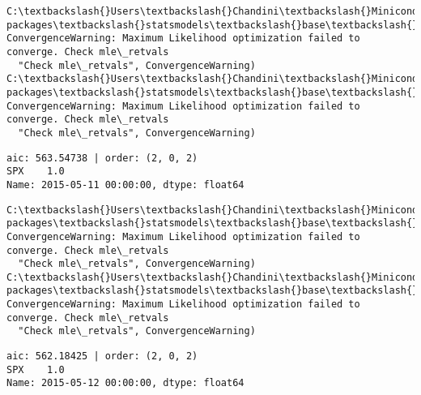 \documentclass[11pt]{article}
\begin{document}
    \begin{Verbatim}[commandchars=\\\{\}]
C:\textbackslash{}Users\textbackslash{}Chandini\textbackslash{}Miniconda3\textbackslash{}envs\textbackslash{}auquan\textbackslash{}lib\textbackslash{}site-packages\textbackslash{}statsmodels\textbackslash{}base\textbackslash{}model.py:496: ConvergenceWarning: Maximum Likelihood optimization failed to converge. Check mle\_retvals
  "Check mle\_retvals", ConvergenceWarning)
C:\textbackslash{}Users\textbackslash{}Chandini\textbackslash{}Miniconda3\textbackslash{}envs\textbackslash{}auquan\textbackslash{}lib\textbackslash{}site-packages\textbackslash{}statsmodels\textbackslash{}base\textbackslash{}model.py:496: ConvergenceWarning: Maximum Likelihood optimization failed to converge. Check mle\_retvals
  "Check mle\_retvals", ConvergenceWarning)

    \end{Verbatim}

    \begin{Verbatim}[commandchars=\\\{\}]
aic: 563.54738 | order: (2, 0, 2)
SPX    1.0
Name: 2015-05-11 00:00:00, dtype: float64

    \end{Verbatim}

    \begin{Verbatim}[commandchars=\\\{\}]
C:\textbackslash{}Users\textbackslash{}Chandini\textbackslash{}Miniconda3\textbackslash{}envs\textbackslash{}auquan\textbackslash{}lib\textbackslash{}site-packages\textbackslash{}statsmodels\textbackslash{}base\textbackslash{}model.py:496: ConvergenceWarning: Maximum Likelihood optimization failed to converge. Check mle\_retvals
  "Check mle\_retvals", ConvergenceWarning)
C:\textbackslash{}Users\textbackslash{}Chandini\textbackslash{}Miniconda3\textbackslash{}envs\textbackslash{}auquan\textbackslash{}lib\textbackslash{}site-packages\textbackslash{}statsmodels\textbackslash{}base\textbackslash{}model.py:496: ConvergenceWarning: Maximum Likelihood optimization failed to converge. Check mle\_retvals
  "Check mle\_retvals", ConvergenceWarning)

    \end{Verbatim}

    \begin{Verbatim}[commandchars=\\\{\}]
aic: 562.18425 | order: (2, 0, 2)
SPX    1.0
Name: 2015-05-12 00:00:00, dtype: float64

    \end{Verbatim}
\end{document}
